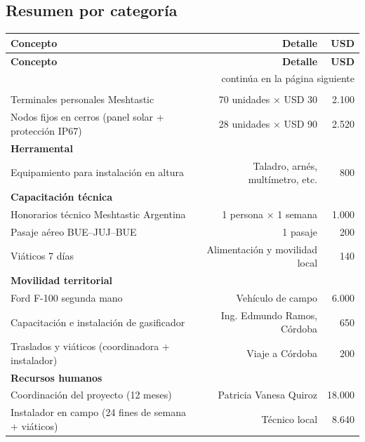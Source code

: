 \documentclass[12pt,a4paper]{article}
\begin{document}
\subsection{Resumen por categoría}

\begin{center}
\begin{longtable}{p{8cm}rr}
\toprule
\textbf{Concepto} & \textbf{Detalle} & \textbf{USD} \\
\midrule
\endfirsthead
\toprule
\textbf{Concepto} & \textbf{Detalle} & \textbf{USD} \\
\midrule
\endhead
\midrule
\multicolumn{3}{r}{\small continúa en la página siguiente}\\
\endfoot
\bottomrule
\endlastfoot

\multicolumn{3}{l}{\textbf{Hardware de red}} \\
Terminales personales Meshtastic
  & 70 unidades × USD 30 & 2.100 \\
Nodos fijos en cerros (panel solar + protección IP67)
  & 28 unidades × USD 90 & 2.520 \\
\midrule

\multicolumn{3}{l}{\textbf{Herramental}} \\
Equipamiento para instalación en altura
  & Taladro, arnés, multímetro, etc. & 800 \\
\midrule

\multicolumn{3}{l}{\textbf{Capacitación técnica}} \\
Honorarios técnico Meshtastic Argentina
  & 1 persona × 1 semana & 1.000 \\
Pasaje aéreo BUE--JUJ--BUE
  & 1 pasaje & 200 \\
Viáticos 7 días
  & Alimentación y movilidad local & 140 \\
\midrule

\multicolumn{3}{l}{\textbf{Movilidad territorial}} \\
Ford F-100 segunda mano
  & Vehículo de campo & 6.000 \\
Capacitación e instalación de gasificador
  & Ing. Edmundo Ramos, Córdoba & 650 \\
Traslados y viáticos (coordinadora + instalador)
  & Viaje a Córdoba & 200 \\
\midrule

\multicolumn{3}{l}{\textbf{Recursos humanos}} \\
Coordinación del proyecto (12 meses)
  & Patricia Vanesa Quiroz & 18.000 \\
Instalador en campo (24 fines de semana + viáticos)
  & Técnico local & 8.640 \\
\midrule


\end{longtable}
\end{center}
\end{document}
